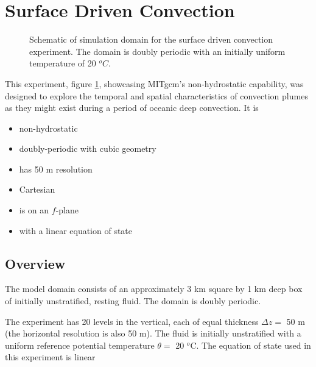 \section{Surface Driven Convection}
\label{sect:eg-bconv}


%
%

\begin{figure}
\begin{center}
\end{center}
\caption{Schematic of simulation domain 
for the surface driven convection experiment. The domain is doubly periodic
with an initially uniform temperature of 20 $^oC$. 
}
\label{FIG:eg-bconv-simulation_config}
\end{figure}

This experiment, figure \ref{FIG:eg-bconv-simulation_config}, showcasing MITgcm's non-hydrostatic capability, was designed to explore 
the temporal and spatial characteristics of convection plumes as they might exist during a 
period of oceanic deep convection. It is

\begin{itemize}
\item non-hydrostatic 
\item doubly-periodic with cubic geometry
\item has 50 m resolution 
\item Cartesian  
\item is on an $f$-plane 
\item with a linear equation of state 
\end{itemize}

\subsection{Overview}

The model domain consists of an approximately 3
km square by 1 km deep box of initially
unstratified, resting fluid. The domain is doubly periodic. 

The experiment has 20 levels in the vertical, each of equal thickness $\Delta z =$ 50
m (the horizontal resolution is also 50 m). The fluid is initially unstratified with a
uniform reference potential temperature $\theta = $ 20 $^o$C. The equation of state
used in this experiment is linear

